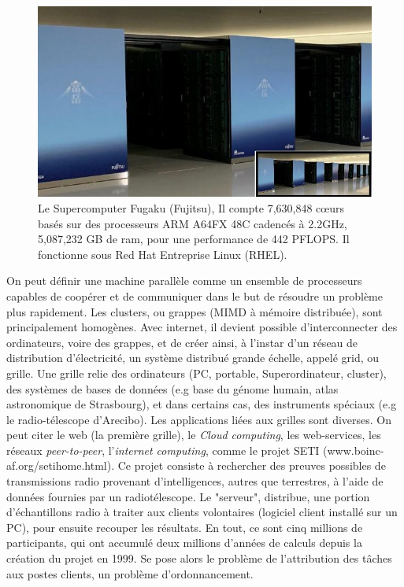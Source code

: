 \documentclass[a4paper,12pt]{report}
\theoremstyle{plain}				%
\theoremstyle{definition}				%
\newcommand{\tdi}[1]{\todo[inline]{{#1}}{}}
\newcommand{\lp}[1]{\todo[author=LP,color=yellow,inline]{#1}}
\begin{document}
\bigskip

\begin{figure}
\centering
\includegraphics[width=11.29cm,height=6.44cm]{Biblio_PCmax_Rendu_Fugaku.jpg}
\caption{Le Supercomputer Fugaku (Fujitsu), 
  Il compte 7,630,848 c\oe{}urs basés sur des processeurs ARM A64FX
  48C cadencés à 2.2GHz, 5,087,232 GB de ram, pour une performance de 442 PFLOPS. 
  Il fonctionne sous Red Hat Entreprise Linux (RHEL).}
\label{fig:Fugaku}
\end{figure}

On peut définir une machine parallèle comme un ensemble de processeurs
capables de coopérer et de communiquer dans le but de résoudre un
problème plus rapidement.
Les clusters, ou grappes (MIMD à mémoire distribuée), sont
principalement homogènes.
Avec internet, il devient possible d'interconnecter des ordinateurs,
voire des grappes, et de créer ainsi, à l'instar d'un réseau de
distribution d'électricité, un système distribué grande échelle,
appelé grid, ou grille.
Une grille relie des ordinateurs (PC, portable,
Superordinateur, cluster), des systèmes de bases de données
(e.g base du génome humain, atlas astronomique de Strasbourg), et dans
certains cas, des instruments spéciaux 
(e.g le radio-télescope d'Arecibo). 
Les applications liées aux grilles sont diverses.
On peut citer le web (la première grille), le \emph{Cloud
  computing}, les web-services, les réseaux \emph{peer-to-peer},
l'\emph{internet computing}, comme le projet SETI
(www.boinc-af.org/setihome.html).
Ce projet consiste à rechercher des preuves possibles de transmissions
radio provenant d'intelligences, autres que terrestres, à l'aide de
données fournies par un radiotélescope.
Le "serveur", distribue, une portion d'échantillons radio à traiter
aux clients volontaires (logiciel client installé sur un PC), pour
ensuite recouper les résultats.
En tout, ce sont cinq millions de participants, qui ont accumulé deux
millions d'années de calculs depuis la création du projet en 1999.
Se pose alors le problème de l'attribution des tâches aux postes
clients, un problème d'ordonnancement.
\end{document}
